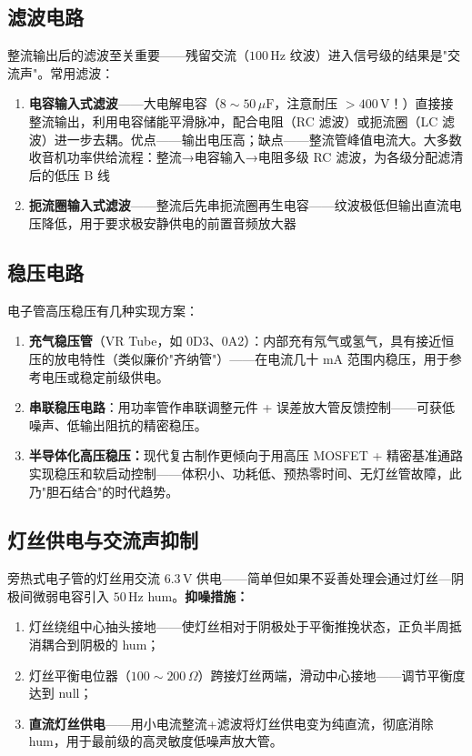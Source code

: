 \documentclass[12pt,UTF8]{ctexbook}
\begin{document}
\subsection{滤波电路}

整流输出后的滤波至关重要——残留交流（$100\,\mathrm{Hz}$ 纹波）进入信号级的结果是"交流声"。常用滤波：
\begin{enumerate}
\item \textbf{电容输入式滤波}——大电解电容（$8\sim50\,\mu\mathrm{F}$，注意耐压 $>400\,\mathrm{V}$！）直接接整流输出，利用电容储能平滑脉冲，配合电阻（RC 滤波）或扼流圈（LC 滤波）进一步去耦。优点——输出电压高；缺点——整流管峰值电流大。大多数收音机功率供给流程：整流→电容输入→电阻多级 RC 滤波，为各级分配滤清后的低压 B 线
\item \textbf{扼流圈输入式滤波}——整流后先串扼流圈再生电容——纹波极低但输出直流电压降低，用于要求极安静供电的前置音频放大器
\end{enumerate}

\subsection{稳压电路}

电子管高压稳压有几种实现方案：
\begin{enumerate}
\item \textbf{充气稳压管}（VR Tube，如 0D3、0A2）：内部充有氖气或氢气，具有接近恒压的放电特性（类似廉价"齐纳管"）——在电流几十 mA 范围内稳压，用于参考电压或稳定前级供电。
\item \textbf{串联稳压电路}：用功率管作串联调整元件 + 误差放大管反馈控制——可获低噪声、低输出阻抗的精密稳压。
\item \textbf{半导体化高压稳压：}现代复古制作更倾向于用高压 MOSFET + 精密基准通路实现稳压和软启动控制——体积小、功耗低、预热零时间、无灯丝管故障，此乃"胆石结合"的时代趋势。
\end{enumerate}

\subsection{灯丝供电与交流声抑制}

旁热式电子管的灯丝用交流 $6.3\,\mathrm{V}$ 供电——简单但如果不妥善处理会通过灯丝—阴极间微弱电容引入 $50\,\mathrm{Hz}$ hum。\textbf{抑噪措施：}
\begin{enumerate}
\item 灯丝绕组中心抽头接地——使灯丝相对于阴极处于平衡推挽状态，正负半周抵消耦合到阴极的 hum；
\item 灯丝平衡电位器（$100\sim200\,\Omega$）跨接灯丝两端，滑动中心接地——调节平衡度达到 null；
\item \textbf{直流灯丝供电}——用小电流整流+滤波将灯丝供电变为纯直流，彻底消除 hum，用于最前级的高灵敏度低噪声放大管。
\end{enumerate}
\end{document}
